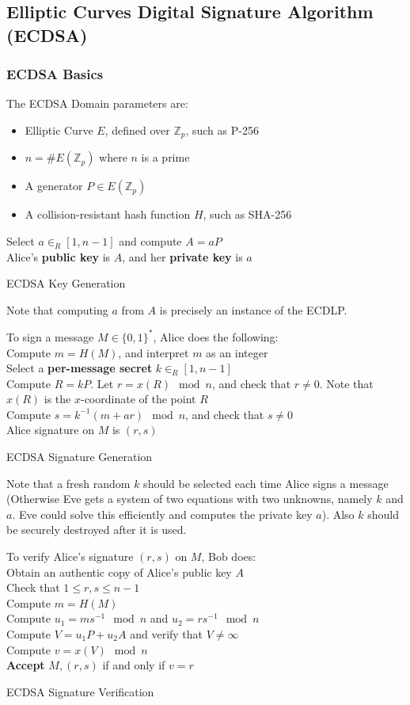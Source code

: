 \documentclass[12pt,titlepage]{article}
\begin{document}
\subsection{Elliptic Curves Digital Signature Algorithm (ECDSA)}
\subsubsection{ECDSA Basics}
The ECDSA Domain parameters are: \begin{itemize}
	\item Elliptic Curve $E$, defined over $\mathbb{Z}_p$, such as P-256
	\item $n = \#E(\mathbb{Z}_p)$ where $n$ is a prime
	\item A generator $P \in E(\mathbb{Z}_p)$
	\item A collision-resistant hash function $H$, such as SHA-256
\end{itemize}
\begin{algorithm}
	Select $a \in_R [1, n-1]$ and compute $A = aP$\\
	Alice's \textbf{public key} is $A$, and her \textbf{private key} is $a$
	\caption{ECDSA Key Generation}
\end{algorithm}
Note that computing $a$ from $A$ is precisely an instance of the ECDLP. 
\begin{algorithm}
	To sign a message $M \in \{0,1\}^*$, Alice does the following: \\
	Compute $m = H(M)$, and interpret $m$ as an integer\\
	Select a \textbf{per-message secret} $k \in_R [1, n-1]$\\
	Compute $R = kP$. Let $r = x(R) \mod n$, and check that $r \neq 0$. Note that $x(R)$ is the $x$-coordinate of the point $R$\\
	Compute $s = k^{-1}(m+ar) \mod n$, and check that $s \neq 0$\\
	Alice signature on $M$ is $(r,s)$ 
	\caption{ECDSA Signature Generation}
\end{algorithm}
Note that a fresh random $k$ should be selected each time Alice signs a message (Otherwise Eve gets a system of two equations with two unknowns, namely $k$ and $a$. Eve could solve this efficiently and computes the private key $a$). Also $k$ should be securely destroyed after it is used. 
\begin{algorithm}
	To verify Alice's signature $(r, s)$ on $M$, Bob does: \\
	Obtain an authentic copy of Alice's public key $A$\\
	Check that $1 \leq r,s \leq n-1$\\
	Compute $m = H(M)$\\
	Compute $u_1 = ms^{-1} \mod n$ and $u_2 = rs^{-1} \mod n$\\
	Compute $V = u_1P + u_2A$ and verify that $V \neq \infty$\\
	Compute $v = x(V) \mod n$\\
	\textbf{Accept} $M, (r,s)$ if and only if $v = r$
	\caption{ECDSA Signature Verification}
\end{algorithm}
\end{document}
